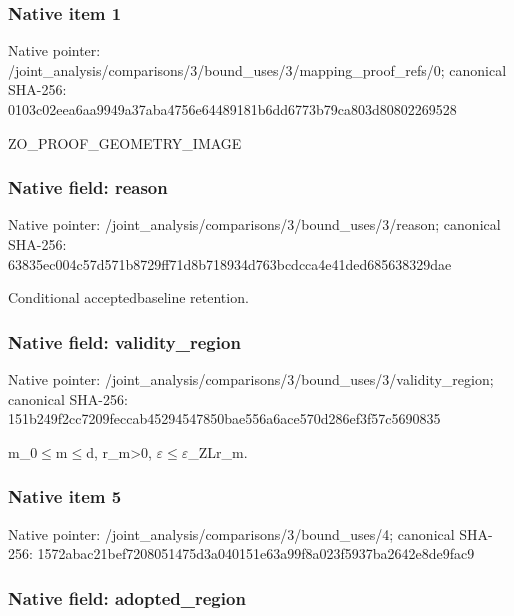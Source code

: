 \documentclass[10pt,a4paper]{article}
\begin{document}
\subsubsection{Native item 1}


Native pointer: /joint\_analysis/comparis\allowbreak{}ons/3/bound\_uses/3/mappi\allowbreak{}ng\_proof\_refs/0; canonical SHA-256: 0103c02eea6aa9949a37aba4\allowbreak{}756e64489181b6dd6773b79c\allowbreak{}a803d80802269528


ZO\_PROOF\_GEOMETRY\_IMAGE


\subsubsection{Native field: reason}


Native pointer: /joint\_analysis/comparis\allowbreak{}ons/3/bound\_uses/3/reaso\allowbreak{}n; canonical SHA-256: 63835ec004c57d571b8729ff\allowbreak{}71d8b718934d763bcdcca4e4\allowbreak{}1ded685638329dae


Conditional acceptedbaseline retention.


\subsubsection{Native field: validity\_region}


Native pointer: /joint\_analysis/comparis\allowbreak{}ons/3/bound\_uses/3/valid\allowbreak{}ity\_region; canonical SHA-256: 151b249f2cc7209feccab452\allowbreak{}94547850bae556a6ace570d2\allowbreak{}86ef3f57c5690835


m\_0\ensuremath{\le}m\ensuremath{\le}d, r\_m>0, \ensuremath{\varepsilon}\ensuremath{\le}\ensuremath{\varepsilon}\_ZLr\_m.


\subsubsection{Native item 5}


Native pointer: /joint\_analysis/comparis\allowbreak{}ons/3/bound\_uses/4; canonical SHA-256: 1572abac21bef7208051475d\allowbreak{}3a040151e63a99f8a023f593\allowbreak{}7ba2642e8de9fac9



\subsubsection{Native field: adopted\_region}
\end{document}
